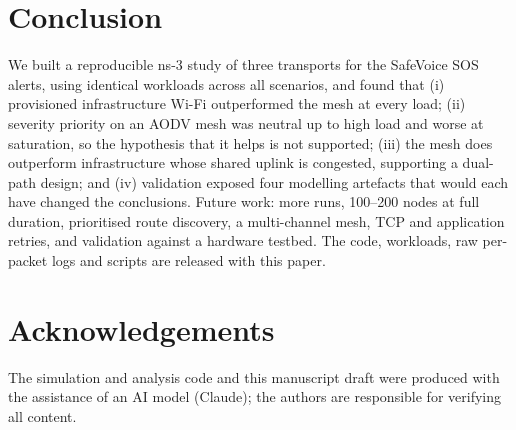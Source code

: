 \section{Conclusion}
We built a reproducible ns-3 study of three transports for the SafeVoice SOS alerts, using identical workloads across all scenarios, and found that
(i) provisioned infrastructure Wi-Fi outperformed the mesh at every load; (ii) severity priority on an AODV mesh was neutral up to high load and worse at saturation, so the hypothesis that it helps is not supported; (iii) the mesh does outperform infrastructure whose shared uplink is congested, supporting a dual-path design;
and (iv) validation exposed four modelling artefacts that would each have changed the conclusions. Future work: more runs, 100--200 nodes at full duration, prioritised route discovery, a multi-channel mesh, TCP and application retries, and validation against a hardware testbed.
The code, workloads, raw per-packet logs and scripts are released with this paper.

\section*{Acknowledgements}
The simulation and analysis code and this manuscript draft were produced with the assistance of an AI model (Claude); the authors are responsible for verifying all content.

